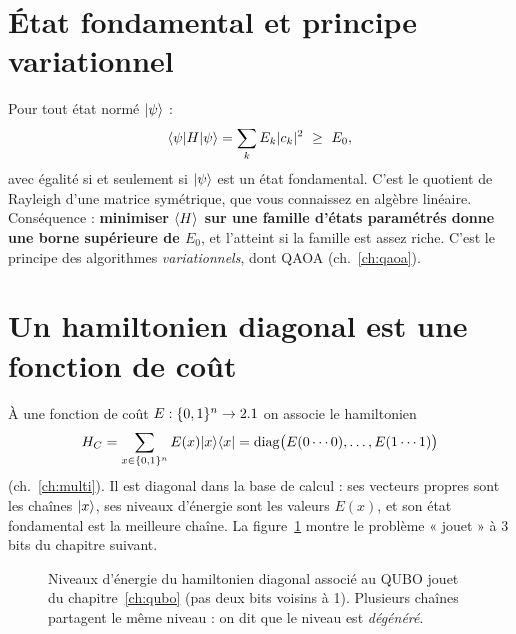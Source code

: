 \section{État fondamental et principe variationnel}
Pour tout état normé $\lvert \psi\rangle$ :
\[\bra\psi H\ket\psi=\sum_kE_k|c_k|^2\ \ge\ E_0,\]
avec égalité si et seulement si $\lvert \psi\rangle$ est un état fondamental. C'est le quotient de Rayleigh d'une matrice symétrique, que vous connaissez en algèbre linéaire. Conséquence : \textbf{minimiser $\langle H\rangle$ sur une famille d'états paramétrés donne une borne supérieure de $E_0$}, et l'atteint si la famille est assez riche. C'est le principe des algorithmes \emph{variationnels}, dont QAOA (ch.~\ref{ch:qaoa}).

\section{Un hamiltonien diagonal est une fonction de coût}\label{sec:cout}
À une fonction de coût $E:\{0,1\}^n\to2.1$ on associe le hamiltonien
\[ H_C=\sum_{x\in\{0,1\}^n}E(x)\lvert x\rangle\langle x\rvert=\mathrm{diag}\big(E(0\cdots0),\dots,E(1\cdots1)\big) \]
(ch.~\ref{ch:multi}). Il est diagonal dans la base de calcul : ses vecteurs propres sont les chaînes $\lvert x\rangle$, ses niveaux d'énergie sont les valeurs $E(x)$, et son état fondamental est la meilleure chaîne. La figure~\ref{fig:niveaux} montre le problème « jouet » à 3 bits du chapitre suivant.

\begin{figure}[htbp]
\centering
{}
\caption{Niveaux d'énergie du hamiltonien diagonal associé au QUBO jouet du chapitre~\ref{ch:qubo} (pas deux bits voisins à 1). Plusieurs chaînes partagent le même niveau : on dit que le niveau est \emph{dégénéré}.}\label{fig:niveaux}
\end{figure}

